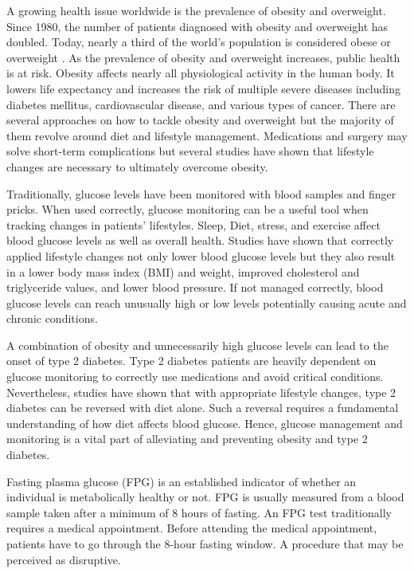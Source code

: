 \documentclass[english, 12pt, a4paper, elec, utf8, a-1b, online]{aaltothesis}
\begin{document}
A growing health issue worldwide is the prevalence of obesity and overweight. Since 1980, the number of patients 
diagnosed with obesity and overweight has doubled. Today, nearly a third of 
the world's population is considered obese or overweight 
\cite{chooi_epidemiology_2019}. As the prevalence of obesity and overweight 
increases, public health is at risk. Obesity affects 
nearly all physiological activity in the human body. It 
lowers life expectancy and increases the risk of multiple 
severe diseases including diabetes mellitus, 
cardiovascular disease, and various types of cancer\cite{chooi_epidemiology_2019}\cite{nammi_obesity_2004}. 
There are several approaches on how to tackle obesity and 
overweight but the majority of them revolve around 
diet and lifestyle management. Medications and surgery may solve 
short-term complications but several studies have shown 
that lifestyle changes are necessary to ultimately 
overcome obesity\cite{nammi_obesity_2004}\cite{mauro_barriers_2008}\cite{powell_effective_2007}.

Traditionally, glucose levels have been monitored with blood 
samples and finger pricks. When used correctly, glucose monitoring can be a useful tool when tracking 
changes in patients' lifestyles. Sleep, Diet, stress, and exercise affect blood
glucose levels as well as overall health\cite{yamaoka_effects_2012}. Studies have shown that correctly applied lifestyle changes
not only lower blood glucose levels but they also result in a lower body mass index (BMI) and weight,
improved cholesterol and triglyceride values, and lower blood pressure\cite{yamaoka_effects_2012}.
If not managed correctly, blood glucose levels can reach unusually high or low levels potentially causing 
acute and chronic conditions\cite{mathew_blood_2022}.  

A combination of obesity
and unnecessarily high glucose levels can lead to the onset of type 2 diabetes\cite{garber_obesity_2012}.
Type 2 diabetes patients are heavily dependent on glucose monitoring 
to correctly use medications and avoid critical conditions\cite{ripsin_management_2009}. 
Nevertheless, studies have shown that
with appropriate lifestyle changes, type 2 diabetes can be reversed with diet alone\cite{taylor_type_2013}. 
Such a reversal requires a fundamental understanding of how diet affects blood glucose.
Hence, glucose management and monitoring is a vital part of alleviating and 
preventing obesity and type 2 diabetes.

Fasting plasma glucose (FPG) is an established indicator of whether 
an individual is metabolically healthy or not\cite{moebus_impact_2011}\cite{danaei_national_2011}. 
FPG is usually measured from a blood sample taken after a minimum of 8 
hours of fasting\cite{the_expert_committee_on_the_diagnosis_and_classification_of_diabetes_mellitus_report_1997}. 
An FPG test traditionally requires a medical appointment. Before attending the medical appointment, patients 
have to go through the 8-hour fasting window. A procedure that may be perceived as disruptive. 
\end{document}
